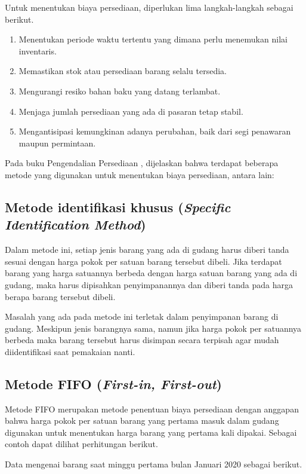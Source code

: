 Untuk menentukan biaya persediaan, diperlukan lima langkah-langkah sebagai berikut.

\begin{enumerate}
	\item Menentukan periode waktu tertentu yang dimana perlu menemukan nilai inventaris.
	\item Memastikan stok atau persediaan barang selalu tersedia.
	\item Mengurangi resiko bahan baku yang datang terlambat.
	\item Menjaga jumlah persediaan yang ada di pasaran tetap stabil.
	\item Mengantisipasi kemungkinan adanya perubahan, baik dari segi penawaran maupun permintaan.
\end{enumerate}

Pada buku Pengendalian Persediaan \citep{pengendalianpersediaan}, dijelaskan bahwa terdapat beberapa metode yang digunakan untuk menentukan biaya persediaan, antara lain:

\subsection{Metode identifikasi khusus (\textit{Specific Identification Method})}

Dalam metode ini, setiap jenis barang yang ada di gudang harus diberi tanda sesuai dengan harga pokok per satuan barang tersebut dibeli. Jika terdapat barang yang harga satuannya berbeda dengan harga satuan barang yang ada di gudang, maka harus dipisahkan penyimpanannya dan diberi tanda pada harga berapa barang tersebut dibeli.

Masalah yang ada pada metode ini terletak dalam penyimpanan barang di gudang. Meskipun jenis barangnya sama, namun jika harga pokok per satuannya berbeda maka barang tersebut harus disimpan secara terpisah agar mudah diidentifikasi saat pemakaian nanti.

\subsection{Metode FIFO (\textit{First-in, First-out})}

Metode FIFO merupakan metode penentuan biaya persediaan dengan anggapan bahwa harga pokok per satuan barang yang pertama masuk dalam gudang digunakan untuk menentukan harga barang yang pertama kali dipakai. Sebagai contoh dapat dilihat perhitungan berikut.

Data mengenai barang saat minggu pertama bulan Januari 2020 sebagai berikut.

